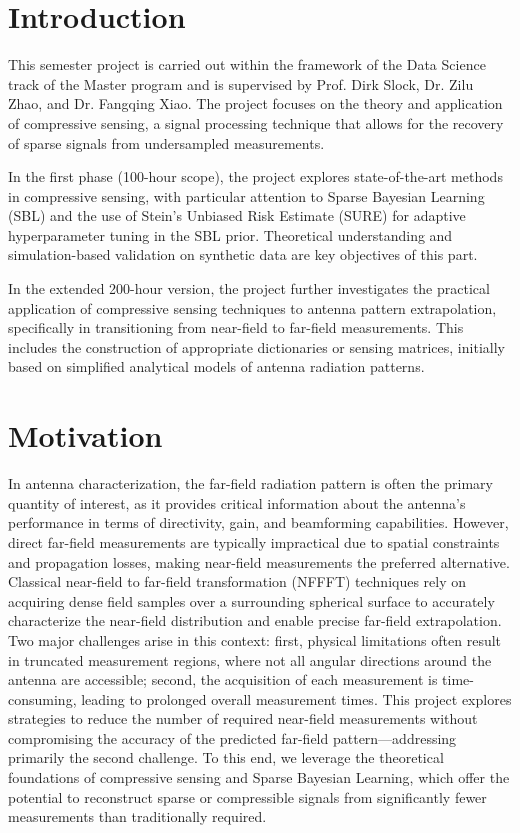 \documentclass{article}
\begin{document}
\section{Introduction}
This semester project is carried out within the framework of the Data Science track of the Master program and is supervised by Prof. Dirk Slock, Dr. Zilu Zhao, and Dr. Fangqing Xiao. The project focuses on the theory and application of compressive sensing, a signal processing technique that allows for the recovery of sparse signals from undersampled measurements.

In the first phase (100-hour scope), the project explores state-of-the-art methods in compressive sensing, with particular attention to Sparse Bayesian Learning (SBL) and the use of Stein’s Unbiased Risk Estimate (SURE) for adaptive hyperparameter tuning in the SBL prior. Theoretical understanding and simulation-based validation on synthetic data are key objectives of this part.

In the extended 200-hour version, the project further investigates the practical application of compressive sensing techniques to antenna pattern extrapolation, specifically in transitioning from near-field to far-field measurements. This includes the construction of appropriate dictionaries or sensing matrices, initially based on simplified analytical models of antenna radiation patterns.

\section{Motivation}
In antenna characterization, the far-field radiation pattern is often the primary quantity of interest, as it provides critical information about the antenna’s performance in terms of directivity, gain, and beamforming capabilities. However, direct far-field measurements are typically impractical due to spatial constraints and propagation losses, making near-field measurements the preferred alternative. Classical near-field to far-field transformation (NFFFT) techniques rely on acquiring dense field samples over a surrounding spherical surface to accurately characterize the near-field distribution and enable precise far-field extrapolation. Two major challenges arise in this context: first, physical limitations often result in truncated measurement regions, where not all angular directions around the antenna are accessible; second, the acquisition of each measurement is time-consuming, leading to prolonged overall measurement times. This project explores strategies to reduce the number of required near-field measurements without compromising the accuracy of the predicted far-field pattern—addressing primarily the second challenge. To this end, we leverage the theoretical foundations of compressive sensing and Sparse Bayesian Learning, which offer the potential to reconstruct sparse or compressible signals from significantly fewer measurements than traditionally required.
\end{document}
